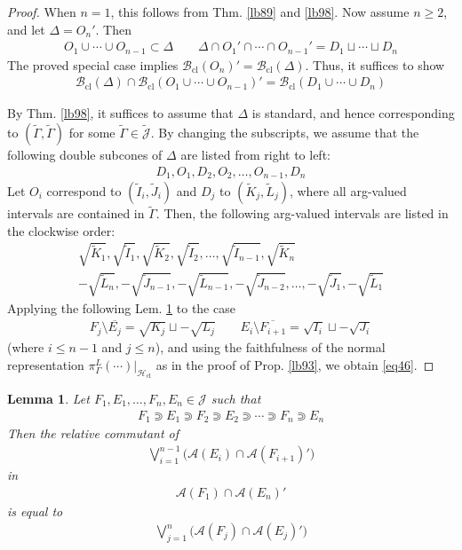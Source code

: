 \documentclass[11pt,b5paper,notitlepage]{article}
\theoremstyle{definition}
\theoremstyle{plain}
\newtheorem{lm}[df]{Lemma}
\newcommand{\wtd}{\widetilde}
\newcommand{\ovl}{\overline}
\newcommand{\Jtd}{\widetilde{\mathcal J}}
\newcommand{\MA}{\mathcal A}
\newcommand{\MJ}{\mathcal J}
\newcommand{\Bcl}{\mathcal B_{\mathrm{cl}}}
\newcommand{\Hcl}{\mathcal H_{\mathrm{cl}}}
\numberwithin{equation}{section}
\begin{document}
\begin{proof}
When $n=1$, this follows from Thm. \ref{lb89} and \ref{lb98}. Now assume $n\geq2$, and let $\Delta=O_n'$. Then
\begin{align*}
O_1\cup\cdots\cup O_{n-1}\subset \Delta\qquad \Delta\cap O_1'\cap\cdots\cap O_{n-1}'=D_1\sqcup\cdots\sqcup D_n
\end{align*}
The proved special case implies $\Bcl(O_n)'=\Bcl(\Delta)$. Thus, it suffices to show
\begin{align}\label{eq46}
\Bcl(\Delta)\cap\Bcl(O_1\cup\cdots\cup O_{n-1})'=\Bcl(D_1\cup\cdots\cup D_n)
\end{align}

By Thm. \ref{lb98}, it suffices to assume that $\Delta$ is standard, and hence corresponding to $(\wtd\Gamma,\wtd\Gamma)$ for some $\wtd\Gamma\in\Jtd$. By changing the subscripts, we assume that the following double subcones of $\Delta$ are listed from right to left:
\begin{align*}
D_1,O_1,D_2,O_2,\dots,O_{n-1},D_n
\end{align*}
Let $O_i$ correspond to $(\wtd I_i,\wtd J_i)$ and $D_j$ to $(\wtd K_j,\wtd L_j)$, where all arg-valued intervals are contained in $\wtd\Gamma$. Then, the following arg-valued intervals are listed in the clockwise order:
\begin{gather*}
\sqrt{\wtd K_1},\sqrt{\wtd I_1},\sqrt{\wtd K_2},\sqrt{\wtd I_2},\dots,\sqrt{\wtd I_{n-1}},\sqrt{\wtd K_n}\\
-\sqrt{\wtd L_n},-\sqrt{\wtd J_{n-1}},-\sqrt{\wtd L_{n-1}},-\sqrt{\wtd J_{n-2}},\dots,-\sqrt{\wtd J_1},-\sqrt{\wtd L_1}
\end{gather*}
Applying the following Lem. \ref{lb106} to the case
\begin{gather*}
F_j\setminus\ovl{E_j}=\sqrt{K_j}\sqcup -\sqrt{L_j}\qquad E_i\setminus\ovl{F_{i+1}}=\sqrt{I_i}\sqcup -\sqrt{J_i} 
\end{gather*}
(where $i\leq n-1$ and $j\leq n$), and using the faithfulness of the normal representation $\pi^L_\Gamma(\cdots)|_{\Hcl}$ as in the proof of Prop. \ref{lb93}, we obtain \eqref{eq46}.
\end{proof}


\begin{lm}\label{lb106}
Let $F_1,E_1,\dots,F_n,E_n\in\MJ$ such that
\begin{align*}
F_1\Supset E_1\Supset F_2\Supset E_2\Supset\cdots\Supset F_n\Supset E_n
\end{align*}
Then the relative commutant of
\begin{align*}
\bigvee_{i=1}^{n-1}\big(\MA(E_i)\cap\MA(F_{i+1})'\big)
\end{align*}
in
\begin{align*}
\MA(F_1)\cap\MA(E_n)'
\end{align*}
is equal to
\begin{align*}
\bigvee_{j=1}^n\big(\MA(F_j)\cap\MA(E_j)'\big)
\end{align*}
\end{lm}
\end{document}
